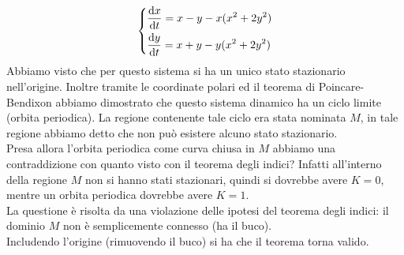 \noindent
\begin{exmp}[]
    \[
    \begin{dcases}
	\frac{\text{d}x}{\text{d} t} = x-y-x(x^2+2y^2) \\
	\frac{\text{d} y}{\text{d} t} =  x+y-y(x^2+2y^2) 
    \end{dcases}
    \]
    Abbiamo visto che per questo sistema si ha un unico stato stazionario nell'origine. Inoltre tramite le coordinate polari ed il teorema di Poincare-Bendixon abbiamo dimostrato che questo sistema dinamico ha un ciclo limite (orbita periodica).
    La regione contenente tale ciclo era stata nominata $M$, in tale regione abbiamo detto che non può esistere alcuno stato stazionario.\\
    Presa allora l'orbita periodica come curva chiusa in $M$ abbiamo una contraddizione con quanto visto con il teorema degli indici? Infatti all'interno della regione $M$ non si hanno stati stazionari, quindi si dovrebbe avere $K=0$, mentre un orbita periodica dovrebbe avere $K = 1$. \\
    La questione è risolta da una violazione delle ipotesi del teorema degli indici: il dominio $M$ non è semplicemente connesso (ha il buco). \\
    Includendo l'origine (rimuovendo il buco) si ha che il teorema torna valido.
\end{exmp}
\noindent
